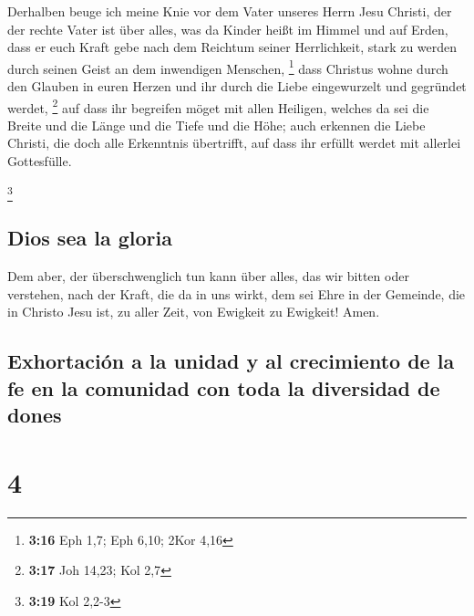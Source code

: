  Derhalben beuge ich meine Knie vor dem Vater unseres
Herrn Jesu Christi,  der der rechte Vater ist über alles,
was da Kinder heißt im Himmel und auf Erden,  dass er
euch Kraft gebe nach dem Reichtum seiner Herrlichkeit, stark zu werden
durch seinen Geist an dem inwendigen Menschen, \footnote{\textbf{3:16}
  Eph 1,7; Eph 6,10; 2Kor 4,16}  dass Christus wohne
durch den Glauben in euren Herzen und ihr durch die Liebe eingewurzelt
und gegründet werdet, \footnote{\textbf{3:17} Joh 14,23; Kol 2,7}
 auf dass ihr begreifen möget mit allen Heiligen, welches
da sei die Breite und die Länge und die Tiefe und die Höhe;
 auch erkennen die Liebe Christi, die doch alle
Erkenntnis übertrifft, auf dass ihr erfüllt werdet mit allerlei
Gottesfülle.

\footnote{\textbf{3:19} Kol 2,2-3}

\hypertarget{dios-sea-la-gloria}{%
\subsection{Dios sea la gloria}\label{dios-sea-la-gloria}}

 Dem aber, der überschwenglich tun kann über alles, das
wir bitten oder verstehen, nach der Kraft, die da in uns wirkt,
 dem sei Ehre in der Gemeinde, die in Christo Jesu ist,
zu aller Zeit, von Ewigkeit zu Ewigkeit! Amen.

\hypertarget{exhortaciuxf3n-a-la-unidad-y-al-crecimiento-de-la-fe-en-la-comunidad-con-toda-la-diversidad-de-dones}{%
\subsection{Exhortación a la unidad y al crecimiento de la fe en la
comunidad con toda la diversidad de
dones}\label{exhortaciuxf3n-a-la-unidad-y-al-crecimiento-de-la-fe-en-la-comunidad-con-toda-la-diversidad-de-dones}}

\hypertarget{section-3}{%
\section{4}\label{section-3}}

